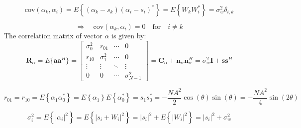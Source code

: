 \[
\text{cov}(\alpha_k, \alpha_i) = E \left\{ (\alpha_k - s_k) (\alpha_i - s_i)^* \right\} = E \left\{ W_k W_i^* \right\} = \sigma_w^2 \delta_{i,k}
\]

\[
\Rightarrow \quad \text{cov}(\alpha_k, \alpha_i) = 0 \quad \text{for} \quad i \neq k
\]
The correlation matrix of vector \(\alpha\) is given by:
\[
\mathbf{R}_{\alpha} = E\{\mathbf{a} \mathbf{a}^H\} =
\begin{bmatrix}
    \sigma_0^2 & r_{01} & \cdots & 0 \\
    r_{10} & \sigma_1^2 & \cdots & 0 \\
    \vdots & \vdots & \ddots & \vdots \\
    0 & 0 & \cdots & \sigma_{N-1}^2
\end{bmatrix}
= \mathbf{C}_{\alpha} + \mathbf{n}_{\alpha} \mathbf{n}_{\alpha}^H = \sigma_w^2 \mathbf{I} + \mathbf{s} \mathbf{s}^H
\]

\[
r_{01} = r_{10} = E\left\{ \alpha_1 \alpha_0^* \right\} = E\left\{ \alpha_1 \right\} E\left\{ \alpha_0^* \right\} = s_1 s_0^* = -\frac{N A^2}{2}\cos(\theta)\sin(\theta) = -\frac{N A^2}{4}\sin(2\theta)
\]

\[
\sigma_i^2 = E\left\{|\alpha_i|^2\right\} = E\left\{ |s_i + W_i|^2 \right\} = |s_i|^2 + E\left\{ |W_i|^2 \right\} = |s_i|^2 + \sigma_w^2
\]

